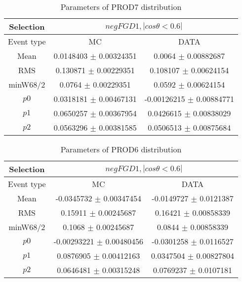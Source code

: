 \documentclass[a4paper,12pt]{article}
\begin{document}
\begin{table}[htbp]
\begin{center}
\begin{tabular}{|c|c|c|}
        \hline
        Selection & \multicolumn{2}{|c|}{$negFGD1, |cos\theta<0.6|$}  \\ \hline
        Event type & MC & DATA \\ 
        \hline
        Mean & 0.0148403 $\pm$ 0.00324351 & 0.0064 $\pm$ 0.00882687 \\ 
        \hline 
        RMS & 0.130871 $\pm$ 0.00229351 & 0.108107 $\pm$ 0.00624154 \\ 
        \hline 
        minW68/2 & 0.0764 $\pm$ 0.00229351 & 0.0592 $\pm$ 0.00624154 \\ 
        \hline 
        $p0$ & 0.0318181 $\pm$ 0.00467131 & -0.00126215 $\pm$ 0.00884771 \\ 
        \hline 
        $p1$ & 0.0650257 $\pm$ 0.00367954 & 0.0426615 $\pm$ 0.00838029 \\ 
        \hline 
        $p2$ & 0.0563296 $\pm$ 0.00381585 & 0.0506513 $\pm$ 0.00875684 \\ 
        \hline 
\end{tabular}
\caption{Parameters of PROD7 distribution } \vspace{0.2in}
\label{xxx}
\end{center}
\end{table}
\begin{table}[htbp]
\begin{center}
\begin{tabular}{|c|c|c|}
        \hline
        Selection & \multicolumn{2}{|c|}{$negFGD1, |cos\theta<0.6|$}  \\ \hline
        Event type & MC & DATA \\ 
        \hline
        Mean & -0.0345732 $\pm$ 0.00347454 & -0.0149727 $\pm$ 0.0121387 \\ 
        \hline 
        RMS & 0.15911 $\pm$ 0.00245687 & 0.16421 $\pm$ 0.00858339 \\ 
        \hline 
        minW68/2 & 0.1068 $\pm$ 0.00245687 & 0.0844 $\pm$ 0.00858339 \\ 
        \hline 
        $p0$ & -0.00293221 $\pm$ 0.00480456 & -0.0301258 $\pm$ 0.0116527 \\ 
        \hline 
        $p1$ & 0.0876905 $\pm$ 0.00412163 & 0.0347504 $\pm$ 0.00827804 \\ 
        \hline 
        $p2$ & 0.0646481 $\pm$ 0.00315248 & 0.0769237 $\pm$ 0.0107181 \\ 
        \hline 
\end{tabular}
\caption{Parameters of PROD6 distribution } \vspace{0.2in}
\label{xxx}
\end{center}
\end{table}
\end{document}
